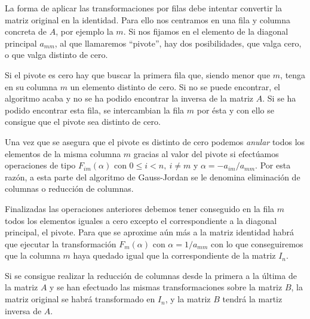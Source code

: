 \documentclass[a4paper,10pt]{article}
\begin{document}
La forma de aplicar las transformaciones por filas debe intentar convertir la matriz original en la identidad. Para ello nos centramos en una fila y columna concreta de $A$, por ejemplo la $m$. Si nos fijamos en el elemento de la diagonal principal $a_{mm}$, al que llamaremos ``pivote'', hay dos posibilidades, que valga cero, o que valga distinto de cero.

\par \vspace{10pt}

Si el pivote es cero hay que buscar la primera fila que, siendo menor que $m$, tenga en su columna $m$ un elemento distinto de cero. Si no se puede encontrar, el algoritmo acaba y no se ha podido encontrar la inversa de la matriz $A$. Si se ha podido encontrar esta fila, se intercambian la fila $m$ por ésta y con ello se consigue que el pivote sea distinto de cero.

\par \vspace{10pt}

Una vez que se asegura que el pivote es distinto de cero podemos \emph{anular} todos los elementos de la misma columna $m$ gracias al valor del pivote si efectúamos operaciones de tipo $F_{im}(\alpha)$ con $0 \leq i < n,\ i\neq m$ y $\alpha = -{a_{im}}/{a_{mm}}$. Por esta razón, a esta parte del algoritmo de Gauss-Jordan se le denomina eliminación de columnas o reducción de columnas.

\par \vspace{10pt}

Finalizadas las operaciones anteriores debemos tener conseguido en la fila $m$ todos los elementos iguales a cero excepto el correspondiente a la diagonal principal, el pivote. Para que se aproxime aún más a la matriz identidad habrá que ejecutar la transformación $F_m(\alpha)$ con $\alpha = 1/a_{mm}$ con lo que conseguiremos que la columna $m$ haya quedado igual que la correspondiente de la matriz $I_n$. 

\par \vspace{10pt}

Si se consigue realizar la reducción de columnas desde la primera a la última de la matriz $A$ y se han efectuado las mismas transformaciones sobre la matriz $B$, la matriz original se habrá transformado en $I_n$, y la matriz $B$ tendrá la martiz inversa de $A$.

\par \vspace{10pt}
\end{document}
